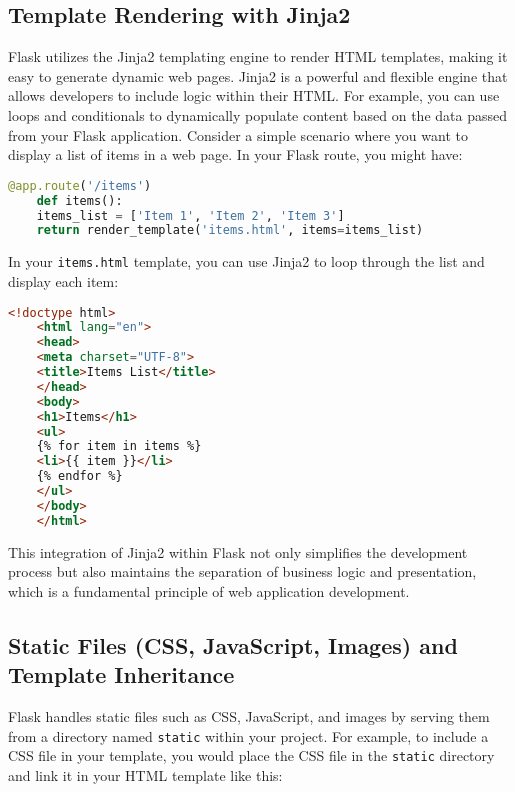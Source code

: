 
\subsection{Template Rendering with Jinja2}

Flask utilizes the Jinja2 templating engine to render HTML templates, making it easy to generate dynamic web pages. Jinja2 is a powerful and flexible engine that allows developers to include logic within their HTML. For example, you can use loops and conditionals to dynamically populate content based on the data passed from your Flask application. Consider a simple scenario where you want to display a list of items in a web page. In your Flask route, you might have:

\begin{lstlisting}[language=Python]
	@app.route('/items')
	def items():
	items_list = ['Item 1', 'Item 2', 'Item 3']
	return render_template('items.html', items=items_list)
\end{lstlisting}

In your \texttt{items.html} template, you can use Jinja2 to loop through the list and display each item:

\begin{lstlisting}[language=HTML]
	<!doctype html>
	<html lang="en">
	<head>
	<meta charset="UTF-8">
	<title>Items List</title>
	</head>
	<body>
	<h1>Items</h1>
	<ul>
	{% for item in items %}
	<li>{{ item }}</li>
	{% endfor %}
	</ul>
	</body>
	</html>
\end{lstlisting}

This integration of Jinja2 within Flask not only simplifies the development process but also maintains the separation of business logic and presentation, which is a fundamental principle of web application development.\cite{Grinberg:2018}

\subsection{Static Files (CSS, JavaScript, Images) and Template Inheritance}

Flask handles static files such as CSS, JavaScript, and images by serving them from a directory named \texttt{static} within your project. For example, to include a CSS file in your template, you would place the CSS file in the \texttt{static} directory and link it in your HTML template like this:

